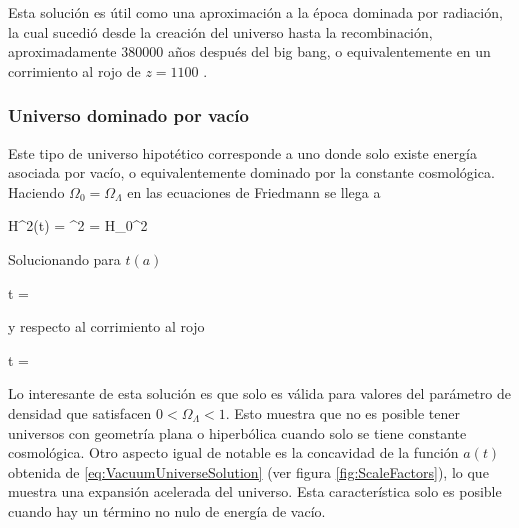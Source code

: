 Esta solución es útil como una aproximación a la época dominada por 
radiación, la cual sucedió desde la creación del universo hasta la 
recombinación, aproximadamente $380 000$ años después del big bang, o 
equivalentemente en un corrimiento al rojo de $z = 1100$ 
\cite{padmanabhan1995}.


			\subsubsection*{Universo dominado por vacío}
			
Este tipo de universo hipotético corresponde a uno donde solo existe 
energía asociada por vacío, o equivalentemente dominado por la constante 
cosmológica. Haciendo $\Omega_0 = \Omega_\Lambda$ en las ecuaciones de 
Friedmann se llega a 


{ H^2(t) = ^2 = H_0^2  }


Solucionando para $t(a)$


{ t = 
\ln{} }


y respecto al corrimiento al rojo


{ t = 
\ln{} }


Lo interesante de esta solución es que solo es válida para valores del
parámetro de densidad que satisfacen $0<\Omega_\Lambda <1$. Esto muestra 
que no es posible tener universos con geometría plana o hiperbólica cuando 
solo se tiene constante cosmológica. Otro aspecto igual de notable es la 
concavidad de la función $a(t)$ obtenida de \ref{eq:VacuumUniverseSolution}
(ver figura \ref{fig:ScaleFactors}), lo que muestra una expansión acelerada
del universo. Esta característica solo es posible cuando hay un término no 
nulo de energía de vacío.


